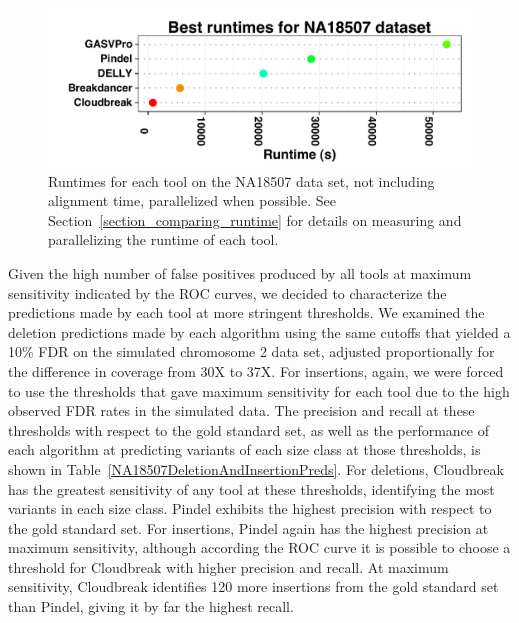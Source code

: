 \begin{figure}
\centering
\includegraphics[width=1\textwidth]{figures/NA18507BestRuntimes_horizontal.pdf}
\caption[Runtimes for each tool on the NA18507 data set.]{Runtimes for each tool on the NA18507 data set, not including alignment time, parallelized when possible. See Section~\ref{section_comparing_runtime} for details on measuring and parallelizing the runtime of each tool.}
\label{NA18507BestRuntimes}
\end{figure}

Given the high number of false positives produced by all tools at maximum sensitivity indicated by the ROC curves, we decided to characterize the predictions made by each tool at more stringent thresholds. We examined the deletion predictions made by each algorithm using the same cutoffs that yielded a 10\% FDR on the simulated chromosome 2 data set, adjusted proportionally for the difference in coverage from 30X to 37X. For insertions, again, we were forced to use the thresholds that gave maximum sensitivity for each tool due to the high observed FDR rates in the simulated data. The precision and recall at these thresholds with respect to the gold standard set, as well as the performance of each algorithm at predicting variants of each size class at those thresholds, is shown in Table~\ref{NA18507DeletionAndInsertionPreds}. For deletions, Cloudbreak has the greatest sensitivity of any tool at these thresholds, identifying the most variants in each size class. Pindel exhibits the highest precision with respect to the gold standard set. For insertions, Pindel again has the highest precision at maximum sensitivity, although according the ROC curve it is possible to choose a threshold for Cloudbreak with higher precision and recall. At maximum sensitivity, Cloudbreak identifies 120 more insertions from the gold standard set than Pindel, giving it by far the highest recall.


